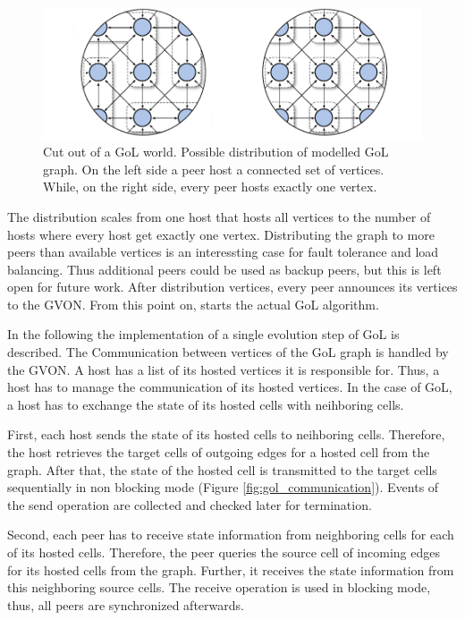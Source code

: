 \begin{figure}[H]
  \centering
  \includegraphics[width=\textwidth]{graphics/40_gol_mapping}
  \caption{Cut out of a GoL world. Possible distribution of modelled
    GoL graph. On the left side a peer host a connected set of
    vertices. While, on the right side, every peer hosts exactly one
    vertex.}
  \label{fig:gol_mapping}
\end{figure}

The distribution scales from one host that hosts all vertices to the
number of hosts where every host get exactly one vertex. Distributing
the graph to more peers than available vertices is an interessting
case for fault tolerance and load balancing. Thus additional peers
could be used as backup peers, but this is left open for future work.
After distribution vertices, every peer announces its vertices to the
GVON.  From this point on, starts the actual GoL algorithm.

In the following the implementation of a single evolution step of GoL
is described. The Communication between vertices of the GoL graph
is handled by the GVON. A host has a list of its hosted vertices it is
responsible for. Thus, a host has to manage the communication of its
hosted vertices. In the case of GoL, a host has to exchange the state
of its hosted cells with neihboring cells.

First, each host sends the state of its hosted cells to neihboring
cells. Therefore, the host retrieves the target cells of outgoing
edges for a hosted cell from the graph. After that, the state of the
hosted cell is transmitted to the target cells sequentially in non
blocking mode (Figure \ref{fig:gol_communication}). Events of the send
operation are collected and checked later for termination.

Second, each peer has to receive state information from neighboring
cells for each of its hosted cells. Therefore, the peer queries the
source cell of incoming edges for its hosted cells from the
graph. Further, it receives the state information from this
neighboring source cells.  The receive operation is used in blocking
mode, thus, all peers are synchronized afterwards.

